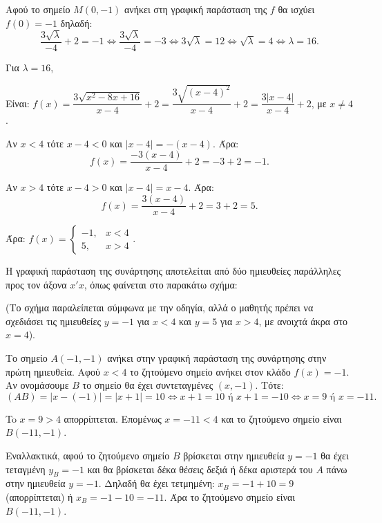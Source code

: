 
\begin{alist}
\item Αφού το σημείο $M(0, -1)$ ανήκει στη γραφική παράσταση της $f$ θα ισχύει $f(0) = -1$
δηλαδή:
\[\dfrac{3\sqrt{\lambda}}{-4} + 2 = -1 \Leftrightarrow \dfrac{3\sqrt{\lambda}}{-4} = -3 \Leftrightarrow 3\sqrt{\lambda} = 12 \Leftrightarrow \sqrt{\lambda} = 4 \Leftrightarrow \lambda = 16.\]

\item Για $\lambda = 16$,
\begin{rlist}
\item Είναι:
$f(x) = \dfrac{3\sqrt{x^2 - 8x + 16}}{x - 4} + 2 = \dfrac{3\sqrt{(x - 4)^2}}{x - 4} + 2 = \dfrac{3|x - 4|}{x - 4} + 2$, με $x \ne 4$.

Αν $x < 4$ τότε $x - 4 < 0$ και $|x - 4| = -(x - 4)$. Άρα:
\[f(x) = \dfrac{-3(x - 4)}{x - 4} + 2 = -3 + 2 = -1.\]

Αν $x > 4$ τότε $x - 4 > 0$ και $|x - 4| = x - 4$. Άρα:
\[f(x) = \dfrac{3(x - 4)}{x - 4} + 2 = 3 + 2 = 5.\]

Άρα: $f(x) = \begin{cases} -1, & x < 4 \\ 5, & x > 4 \end{cases}$.

\item Η γραφική παράσταση της συνάρτησης αποτελείται από δύο ημιευθείες παράλληλες
προς τον άξονα $x'x$, όπως φαίνεται στο παρακάτω σχήμα:

(Το σχήμα παραλείπεται σύμφωνα με την οδηγία, αλλά ο μαθητής πρέπει να σχεδιάσει τις ημιευθείες $y = -1$ για $x < 4$ και $y = 5$ για $x > 4$, με ανοιχτά άκρα στο $x = 4$).

\item Το σημείο $A(-1, -1)$ ανήκει στην γραφική παράσταση της συνάρτησης στην πρώτη
ημιευθεία.
Αφού $x < 4$ το ζητούμενο σημείο ανήκει στον κλάδο $f(x) = -1$. Αν ονομάσουμε $B$
το σημείο θα έχει συντεταγμένες $(x, -1)$. Τότε:
\[(AB) = |x - (-1)| = |x + 1| = 10 \Leftrightarrow x + 1 = 10 \text{ ή } x + 1 = -10 \Leftrightarrow x = 9 \text{ ή } x = -11.\]

To $x = 9 > 4$ απορρίπτεται. Επομένως $x = -11 < 4$ και το ζητούμενο σημείο είναι
$B(-11, -1)$.

Εναλλακτικά, αφού το ζητούμενο σημείο $B$
βρίσκεται στην ημιευθεία $y = -1$ θα έχει τεταγμένη $y_B = -1$ και θα βρίσκεται δέκα
θέσεις δεξιά ή δέκα αριστερά του $A$ πάνω στην ημιευθεία $y = -1$. Δηλαδή θα έχει
τετμημένη:
$x_B = -1 + 10 = 9$ (απορρίπτεται) ή $x_B = -1 - 10 = -11$.
Άρα το ζητούμενο σημείο είναι $B(-11, -1)$.
\end{rlist}
\end{alist}

